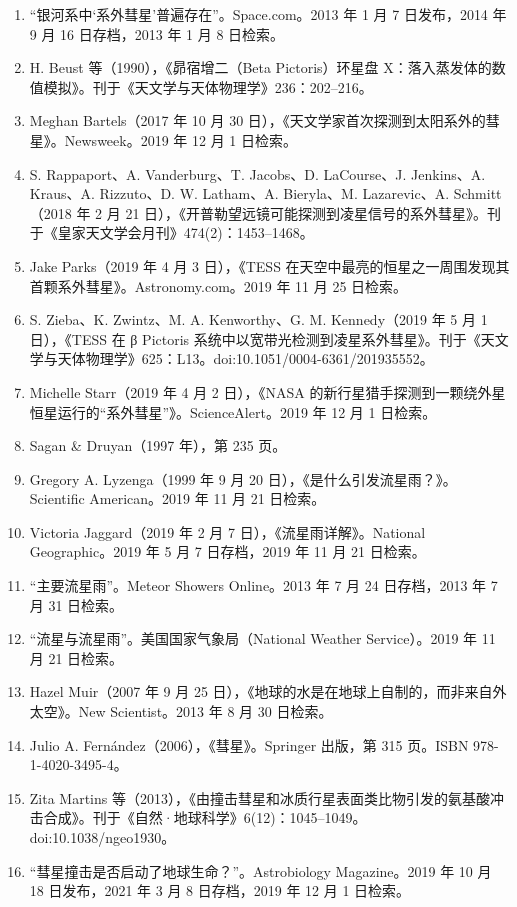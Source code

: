 \begin{enumerate}
\item “银河系中‘系外彗星’普遍存在”。Space.com。2013 年 1 月 7 日发布，2014 年 9 月 16 日存档，2013 年 1 月 8 日检索。
\item H. Beust 等（1990），《昴宿增二（Beta Pictoris）环星盘 X：落入蒸发体的数值模拟》。刊于《天文学与天体物理学》236：202–216。
\item Meghan Bartels（2017 年 10 月 30 日），《天文学家首次探测到太阳系外的彗星》。Newsweek。2019 年 12 月 1 日检索。
\item S. Rappaport、A. Vanderburg、T. Jacobs、D. LaCourse、J. Jenkins、A. Kraus、A. Rizzuto、D. W. Latham、A. Bieryla、M. Lazarevic、A. Schmitt（2018 年 2 月 21 日），《开普勒望远镜可能探测到凌星信号的系外彗星》。刊于《皇家天文学会月刊》474(2)：1453–1468。
\item Jake Parks（2019 年 4 月 3 日），《TESS 在天空中最亮的恒星之一周围发现其首颗系外彗星》。Astronomy.com。2019 年 11 月 25 日检索。
\item S. Zieba、K. Zwintz、M. A. Kenworthy、G. M. Kennedy（2019 年 5 月 1 日），《TESS 在 β Pictoris 系统中以宽带光检测到凌星系外彗星》。刊于《天文学与天体物理学》625：L13。doi:10.1051/0004-6361/201935552。
\item Michelle Starr（2019 年 4 月 2 日），《NASA 的新行星猎手探测到一颗绕外星恒星运行的“系外彗星”》。ScienceAlert。2019 年 12 月 1 日检索。
\item Sagan & Druyan（1997 年），第 235 页。
\item Gregory A. Lyzenga（1999 年 9 月 20 日），《是什么引发流星雨？》。Scientific American。2019 年 11 月 21 日检索。
\item Victoria Jaggard（2019 年 2 月 7 日），《流星雨详解》。National Geographic。2019 年 5 月 7 日存档，2019 年 11 月 21 日检索。
\item “主要流星雨”。Meteor Showers Online。2013 年 7 月 24 日存档，2013 年 7 月 31 日检索。
\item “流星与流星雨”。美国国家气象局（National Weather Service）。2019 年 11 月 21 日检索。
\item Hazel Muir（2007 年 9 月 25 日），《地球的水是在地球上自制的，而非来自外太空》。New Scientist。2013 年 8 月 30 日检索。
\item Julio A. Fernández（2006），《彗星》。Springer 出版，第 315 页。ISBN 978-1-4020-3495-4。
\item Zita Martins 等（2013），《由撞击彗星和冰质行星表面类比物引发的氨基酸冲击合成》。刊于《自然·地球科学》6(12)：1045–1049。doi:10.1038/ngeo1930。
\item “彗星撞击是否启动了地球生命？”。Astrobiology Magazine。2019 年 10 月 18 日发布，2021 年 3 月 8 日存档，2019 年 12 月 1 日检索。

\end{enumerate}
